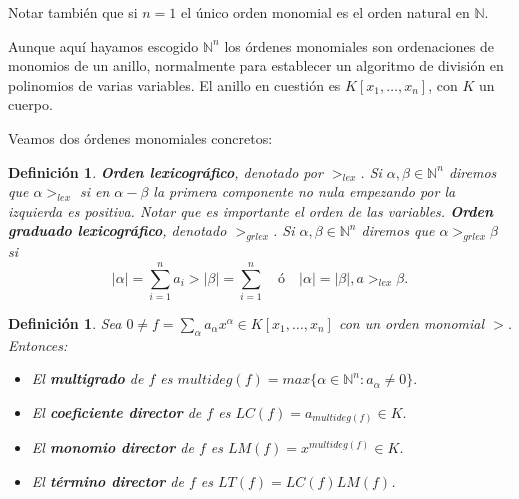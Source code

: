 \documentclass[12pt]{article}
\newtheorem{definition}[theorem]{Definición}
\begin{document}
Notar también que si $n=1$ el único orden monomial es el orden natural en $\mathbb{N}$.

Aunque aquí hayamos escogido $\mathbb{N}^n$ los órdenes monomiales son ordenaciones de monomios de un anillo, normalmente para establecer un algoritmo de división en polinomios de varias variables. El anillo en cuestión es $K[x_1, \ldots, x_n]$, con $K$ un cuerpo.

Veamos dos órdenes monomiales concretos:

\begin{definition}\textbf{Orden lexicográfico}, denotado por $>_{lex}$. Si $\alpha, \beta \in \mathbb{N}^n$ diremos que $\alpha >_{lex}$ si en $\alpha - \beta$ la primera componente no nula empezando por la izquierda es positiva. Notar que es importante el orden de las variables. \textbf{Orden graduado lexicográfico}, denotado $>_{grlex}$. Si $\alpha, \beta \in \mathbb{N}^n$ diremos que $\alpha >_{grlex}\beta$ si $$|\alpha| = \sum_{i=1}^n a_i > |\beta| = \sum_{i=1}^n \quad \text{ó} \quad |\alpha| = |\beta|, a>_{lex} \beta.$$
\end{definition}

\begin{definition}Sea $0 \neq f = \sum_\alpha a_\alpha x^\alpha \in K[x_1, \ldots, x_n]$ con un orden monomial $>$. Entonces: 
\begin{itemize}
\item El \textbf{multigrado} de $f$ es $multideg(f) = max\lbrace\alpha \in \mathbb{N}^n: a_\alpha \neq 0\rbrace.$
\item El \textbf{coeficiente director} de $f$ es $LC(f) = a_{multideg(f)}\in K.$
\item El \textbf{monomio director} de $f$ es $LM(f) = x^{multideg(f)}\in K$.
\item El \textbf{término director} de $f$ es $LT(f) = LC(f)LM(f)$.
\end{itemize}
\end{definition}
\end{document}
